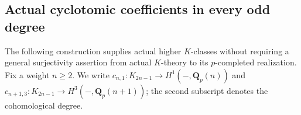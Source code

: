 \documentclass[11pt,a4paper]{article}
\theoremstyle{remark}
\newcommand{\Q}{\mathbf Q}
\begin{document}

\subsection{Actual cyclotomic coefficients in every odd degree}
\label{sec:completedhigherodd}

The following construction supplies actual higher $K$-classes without
requiring a general surjectivity assertion from actual $K$-theory to
its $p$-completed realization. Fix a weight $n\geq2$. We write
$c_{n,1}:K_{2n-1}\to H^1(-,\Q_p(n))$ and
$c_{n+1,3}:K_{2n-1}\to H^3(-,\Q_p(n+1))$; the second subscript
denotes the cohomological degree.
\end{document}
